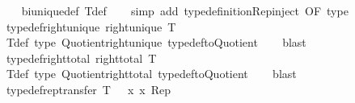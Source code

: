 \begin{isabellebody}
%
\isadelimproof
\ \ %
\endisadelimproof
%
\isatagproof
{}\isamarkupfalse%
\ bi{\isacharunderscore}{\kern0pt}unique{\isacharunderscore}{\kern0pt}def\ T{\isacharunderscore}{\kern0pt}def\isanewline
\ \ \isamarkupfalse%
\ {\isacharparenleft}{\kern0pt}simp\ add{\isacharcolon}{\kern0pt}\ type{\isacharunderscore}{\kern0pt}definition{\isachardot}{\kern0pt}Rep{\isacharunderscore}{\kern0pt}inject\ {\isacharbrackleft}{\kern0pt}OF\ type{\isacharbrackright}{\kern0pt}{\isacharparenright}{\kern0pt}%
\endisatagproof
{\isafoldproof}%
%
\isadelimproof
\isanewline
%
\endisadelimproof
\isanewline
\isanewline
\isanewline
{}\isamarkupfalse%
\ typedef{\isacharunderscore}{\kern0pt}right{\isacharunderscore}{\kern0pt}unique{\isacharcolon}{\kern0pt}\ {\isachardoublequoteopen}right{\isacharunderscore}{\kern0pt}unique\ T{\isachardoublequoteclose}\isanewline
%
\isadelimproof
\ \ %
\endisadelimproof
%
\isatagproof
{}\isamarkupfalse%
\ T{\isacharunderscore}{\kern0pt}def\ type\ Quotient{\isacharunderscore}{\kern0pt}right{\isacharunderscore}{\kern0pt}unique\ typedef{\isacharunderscore}{\kern0pt}to{\isacharunderscore}{\kern0pt}Quotient\isanewline
\ \ \isamarkupfalse%
\ blast%
\endisatagproof
{\isafoldproof}%
%
\isadelimproof
\isanewline
%
\endisadelimproof
\isanewline
{}\isamarkupfalse%
\ typedef{\isacharunderscore}{\kern0pt}right{\isacharunderscore}{\kern0pt}total{\isacharcolon}{\kern0pt}\ {\isachardoublequoteopen}right{\isacharunderscore}{\kern0pt}total\ T{\isachardoublequoteclose}\isanewline
%
\isadelimproof
\ \ %
\endisadelimproof
%
\isatagproof
{}\isamarkupfalse%
\ T{\isacharunderscore}{\kern0pt}def\ type\ Quotient{\isacharunderscore}{\kern0pt}right{\isacharunderscore}{\kern0pt}total\ typedef{\isacharunderscore}{\kern0pt}to{\isacharunderscore}{\kern0pt}Quotient\isanewline
\ \ \isamarkupfalse%
\ blast%
\endisatagproof
{\isafoldproof}%
%
\isadelimproof
\isanewline
%
\endisadelimproof
\isanewline
{}\isamarkupfalse%
\ typedef{\isacharunderscore}{\kern0pt}rep{\isacharunderscore}{\kern0pt}transfer{\isacharcolon}{\kern0pt}\ {\isachardoublequoteopen}{\isacharparenleft}{\kern0pt}T\ {\isacharequal}{\kern0pt}{\isacharequal}{\kern0pt}{\isacharequal}{\kern0pt}{\isachargreater}{\kern0pt}\ {\isacharparenleft}{\kern0pt}{\isacharequal}{\kern0pt}{\isacharparenright}{\kern0pt}{\isacharparenright}{\kern0pt}\ {\isacharparenleft}{\kern0pt}{\isasymlambda}x{\isachardot}{\kern0pt}\ x{\isacharparenright}{\kern0pt}\ Rep{\isachardoublequoteclose}\isanewline
%
\isadelimproof

\end{isabellebody}
